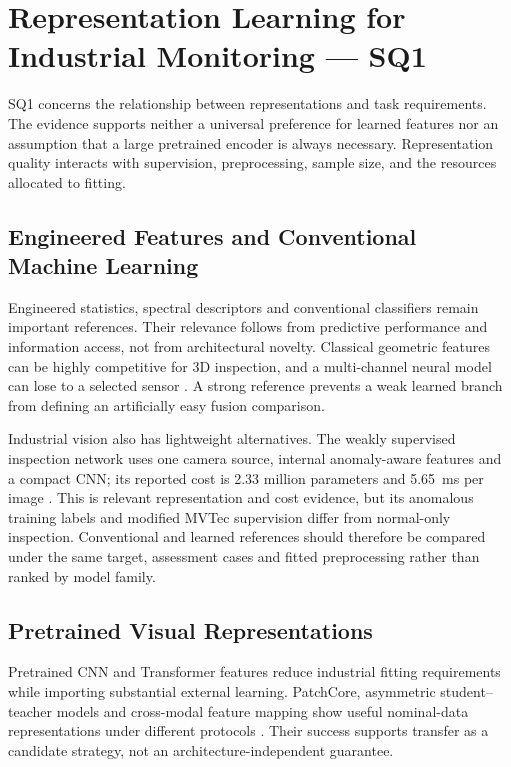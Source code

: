 \section{Representation Learning for Industrial Monitoring --- SQ1}

SQ1 concerns the relationship between representations and task requirements. The evidence supports neither a universal preference for learned features nor an assumption that a large pretrained encoder is always necessary. Representation quality interacts with supervision, preprocessing, sample size, and the resources allocated to fitting.

\subsection{Engineered Features and Conventional Machine Learning}
Engineered statistics, spectral descriptors and conventional classifiers remain important references. Their relevance follows from predictive performance and information access, not from architectural novelty. Classical geometric features can be highly competitive for 3D inspection, and a multi-channel neural model can lose to a selected sensor \citep{Horwitz2023Back,Goodarzi2023Deep}. A strong reference prevents a weak learned branch from defining an artificially easy fusion comparison.

Industrial vision also has lightweight alternatives. The weakly supervised inspection network uses one camera source, internal anomaly-aware features and a compact CNN; its reported cost is 2.33 million parameters and 5.65~ms per image \citep[PDF p.~10, Table~V]{P035}. This is relevant representation and cost evidence, but its anomalous training labels and modified MVTec supervision differ from normal-only inspection. Conventional and learned references should therefore be compared under the same target, assessment cases and fitted preprocessing rather than ranked by model family.

\subsection{Pretrained Visual Representations}
Pretrained CNN and Transformer features reduce industrial fitting requirements while importing substantial external learning. PatchCore, asymmetric student--teacher models and cross-modal feature mapping show useful nominal-data representations under different protocols \citep{Roth2022Towards,Rudolph2023Asymmetric,Costanzino2024Multimodal}. Their success supports transfer as a candidate strategy, not an architecture-independent guarantee.

